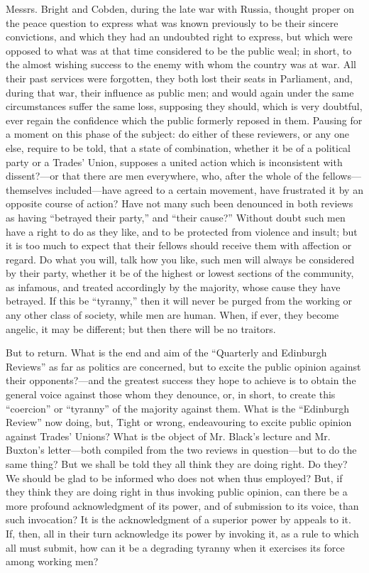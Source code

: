 Messrs. Bright and Cobden, during the late war with Russia, thought
proper on the peace question to express what was known previously to be
their sincere convictions, and which they had an undoubted right to
express, but which were opposed to what was at that time considered to
be the public weal; in short, to the almost wishing success to the enemy
with whom the country was at war. All their past services were
forgotten, they both lost their seats in Parliament, and, during that
war, their influence as public men; and would again under the same
circumstances suffer the same loss, supposing they should, which is very
doubtful, ever regain the confidence which the public formerly reposed
in them. Pausing for a moment on this phase of the subject: do either of
these reviewers, or any one else, require to be told, that a state of
combination, whether it be of a political party or a Trades' Union,
supposes a united action which is inconsistent with dissent?---or that
there are men everywhere, who, after the whole of the fellows---
themselves included---have agreed to a certain movement, have frustrated
it by an opposite course of action? Have not many such been denounced in
both reviews as having ``betrayed their party,'' and ``their cause?''
Without doubt such men have a right to do as they like, and to be
protected from violence and insult; but it is too much to expect that
their fellows should receive them with affection or regard. Do what you
will, talk how you like, such men will always be considered by their
party, whether it be of the highest or lowest sections of the community,
as infamous, and treated accordingly by the majority, whose cause they
have betrayed. If this be ``tyranny,'' then it will never be purged from
the working or any other class of society, while men are human. When, if
ever, they become angelic, it may be different; but then there will be
no traitors.

But to return. What is the end and aim of the ``Quarterly and Edinburgh
Reviews'' as far as politics are concerned, but to excite the public
opinion against their opponents?---and the greatest success they hope to
achieve is to obtain the general voice against those whom they denounce,
or, in short, to create this ``coercion'' or ``tyranny'' of the majority
against them. What is the ``Edinburgh Review'' now doing, but, Tight or
wrong, endeavouring to excite public opinion against Trades' Unions?
What is tbe object of Mr. Black's lecture and Mr. Buxton's letter---both
compiled from the two reviews in question---but to do the same thing?
But we shall be told they all think they are doing right. Do they? We
should be glad to be informed who does not when thus employed? But, if
they think they are doing right in thus invoking public opinion, can
there be a more profound acknowledgment of its power, and of submission
to its voice, than such invocation? It is the acknowledgment of a
superior power by appeals to it. If, then, all in their turn acknowledge
its power by invoking it, as a rule to which all must submit, how can
it be a degrading tyranny when it exercises its force among working men?

